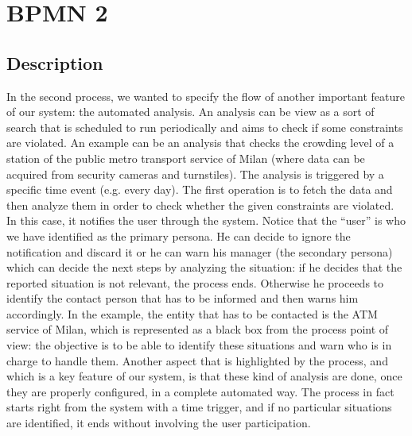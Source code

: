 \documentclass[../main.tex]{subfiles}
\begin{document}
    \chapter{BPMN 2}\label{ch:bpmn-2}
    \section{Description}\label{sec:description}
    In the second process, we wanted to specify the flow of another important feature of our system: the automated analysis. An analysis can be view as a sort of search that is scheduled to run periodically and aims to check if some constraints are violated.
    An example can be an analysis that checks the crowding level of a station of the public metro transport service of Milan (where data can be acquired from security cameras and turnstiles).
    The analysis is triggered by a specific time event (e.g. every day). The first operation is to fetch the data and then analyze them in order to check whether the given constraints are violated. In this case, it notifies the user through the system. Notice that the “user” is who we have identified as the primary persona. He can decide to ignore the notification and discard it or he can warn his manager (the secondary persona) which can decide the next steps by analyzing the situation: if he decides that the reported situation is not relevant, the process ends.
    Otherwise he proceeds to identify the contact person that has to be informed and then warns him accordingly. In the example, the entity that has to be contacted is the ATM service of Milan, which is represented as a black box from the process point of view: the objective is to be able to identify these situations and warn who is in charge to handle them.
    Another aspect that is highlighted by the process, and which is a key feature of our system, is that these kind of analysis are done, once they are properly configured, in a complete automated way. The process in fact starts right from the system with a time trigger, and if no particular situations are identified, it ends without involving the user participation.
\end{document}
